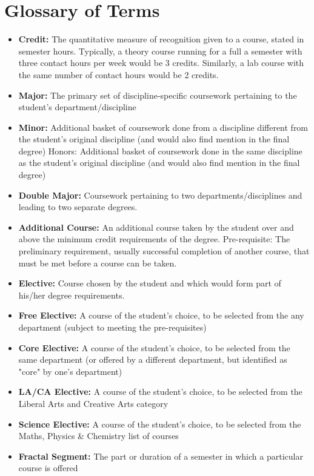 

\section{Glossary of Terms }
\begin{itemize}
\item {\bf Credit:} The quantitative measure of recognition given to a course, stated in semester hours. Typically, a theory course running for a full a semester with three contact hours per week would be 3 credits. Similarly, a lab course with the same number of contact hours would be 2 credits.  
\item {\bf Major:} The primary set of discipline-specific coursework pertaining to the student’s department/discipline  
\item {\bf Minor:} Additional basket of coursework done from a discipline different from the student’s original discipline (and would also find mention in the final degree)
Honors: Additional basket of coursework done in the same discipline as the student’s original discipline (and would also find mention in the final degree)
\item {\bf Double Major:} Coursework pertaining to two departments/disciplines and leading to two separate degrees.
\item {\bf Additional Course:} An additional course taken by the student over and above the minimum credit requirements of the degree. 
Pre-requisite: The preliminary requirement, usually successful completion of another course, that must be met before a course can be taken.
\item {\bf Elective:} Course chosen by the student and which would form part of his/her degree requirements. 
\item {\bf Free Elective:} A course of the student’s choice, to be selected from the any department (subject to meeting the pre-requisites) 
\item {\bf Core Elective:} A course of the student’s choice, to be selected from the same department (or offered by a different department, but identified as "core" by one's department)
\item {\bf LA/CA Elective:} A course of the student’s choice, to be selected from the Liberal Arts and Creative Arts category 
\item {\bf Science Elective:} A course of the student’s choice, to be selected from the Maths, Physics \& Chemistry list of courses
\item {\bf Fractal Segment:} The part or duration of a semester in which a particular course is offered
\end{itemize}

